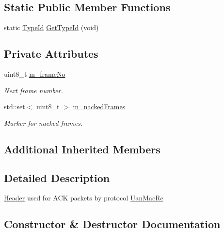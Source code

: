 \subsection*{Static Public Member Functions}
\begin{DoxyCompactItemize}
\item 
static \hyperlink{classns3_1_1TypeId}{Type\+Id} \hyperlink{classns3_1_1UanHeaderRcAck_a3dc3ae218011ceb522bce78c47358547}{Get\+Type\+Id} (void)
\end{DoxyCompactItemize}
\subsection*{Private Attributes}
\begin{DoxyCompactItemize}
\item 
uint8\+\_\+t \hyperlink{classns3_1_1UanHeaderRcAck_a2611c1a8084eb27d207a4c223bfda5cb}{m\+\_\+frame\+No}
\begin{DoxyCompactList}\small\item\em Next frame number. \end{DoxyCompactList}\item 
std\+::set$<$ uint8\+\_\+t $>$ \hyperlink{classns3_1_1UanHeaderRcAck_a59ea630450a15c8afb68ec426bfd7d54}{m\+\_\+nacked\+Frames}
\begin{DoxyCompactList}\small\item\em Marker for nacked frames. \end{DoxyCompactList}\end{DoxyCompactItemize}
\subsection*{Additional Inherited Members}


\subsection{Detailed Description}
\hyperlink{classns3_1_1Header}{Header} used for A\+CK packets by protocol \hyperlink{classns3_1_1UanMacRc}{Uan\+Mac\+Rc} 

\subsection{Constructor \& Destructor Documentation}
